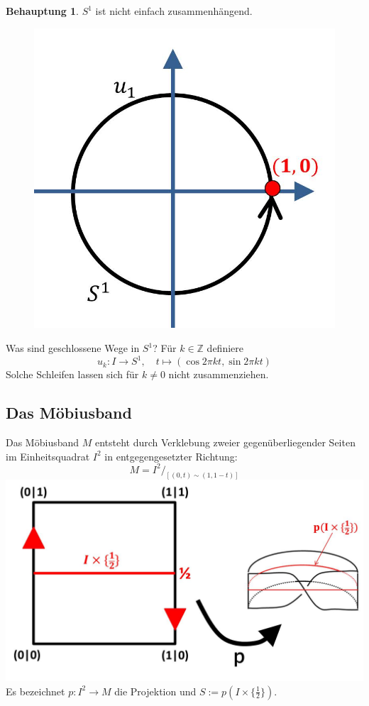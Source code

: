 \documentclass[a4paper,11pt,notitlepage]{report}
\theoremstyle{definition}
\newtheorem{beh}{Behauptung}[chapter]
\newcommand{\Z}{{\ensuremath{\mathbb{Z}}}}
\begin{document}
\begin{beh}
	$S^1$ ist nicht einfach zusammenhängend.
	\begin{figure}[h]
	\includegraphics[scale=0.4]{images/S1_nichttrivialer_Weg.jpg}
	\end{figure}
\end{beh}
Was sind geschlossene Wege in $S^1$?
\newline
Für $ k \in \Z$ definiere
$$u_k \colon I \rightarrow S^1, \quad t \mapsto (\cos 2 \pi k t, \sin 2 \pi k t)$$
Solche Schleifen lassen sich für $k \neq 0$ nicht zusammenziehen.

\subsection{Das Möbiusband}
Das Möbiusband $M$ entsteht durch Verklebung zweier gegenüberliegender Seiten im Einheitsquadrat $I^2$ in entgegengesetzter Richtung:
$$M = I^2/_{[(0,t) \sim (1, 1-t)]}$$
	\includegraphics[scale=0.4]{images/Moebiusband.jpg}
\newline
Es bezeichnet $p \colon I^2 \rightarrow M$ die Projektion und $S:= p(I \times \{\frac{1}{2}\})$.
\end{document}
